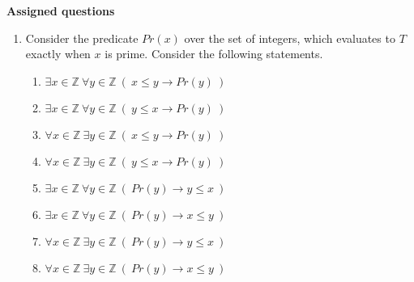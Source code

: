 {\bf Assigned questions}

\begin{enumerate}
   \item Consider the predicate $Pr(x)$ over the set of integers, which evaluates to $T$ exactly when 
   $x$ is prime. Consider the following statements.
   
    \begin{multicols}{2}
    \begin{enumerate}[label=(\roman*)]
        \item $\exists x \in \mathbb{Z}~ \forall y \in \mathbb{Z}~(~x \leq y \to Pr(y)~)$
        \item $\exists x \in \mathbb{Z}~ \forall y \in \mathbb{Z}~(~y \leq x \to Pr(y)~)$
        \item $\forall x \in \mathbb{Z}~ \exists y \in \mathbb{Z}~(~x \leq y \to Pr(y)~)$
        \item $\forall x \in \mathbb{Z}~ \exists y \in \mathbb{Z}~(~y \leq x \to Pr(y)~)$
        \item $\exists x \in \mathbb{Z}~ \forall y \in \mathbb{Z}~(~Pr(y) \to y \leq x~)$
        \item $\exists x \in \mathbb{Z}~ \forall y \in \mathbb{Z}~(~Pr(y) \to x \leq y~)$
        \item $\forall x \in \mathbb{Z}~ \exists y \in \mathbb{Z}~(~Pr(y) \to y \leq x~)$
        \item $\forall x \in \mathbb{Z}~ \exists y \in \mathbb{Z}~(~Pr(y) \to x \leq y~)$
    \end{enumerate}
    \end{multicols}
   
   \begin{enumerate}
   

\end{enumerate}
\end{enumerate}
